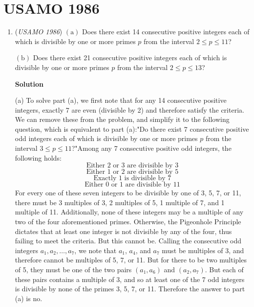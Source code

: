 \section{USAMO 1986}
        \begin{enumerate}
        	\item (\textit{USAMO 1986}) $(\text{a})$ Does there exist 14 consecutive positive integers each of which is divisible by one or more primes $p$ from the interval $2\le p \le 11$?


 $(\text{b})$ Does there exist 21 consecutive positive integers each of which is divisible by one or more primes $p$ from the interval $2\le p \le 13$?


 



\textbf{Solution}

(a)     To solve part (a), we first note that for any 14 consecutive positive integers, exactly 7 are even (divisible by 2) and therefore satisfy the criteria. We can remove these from the problem, and simplify it to the following question, which is equivalent to part (a):"Do there exist 7 consecutive positive odd integers each of which is divisible by one or more primes $p$ from the interval $3\le p \le 11$?"Among any 7 consecutive positive odd integers, the following holds:
 \[\text{Either 2 or 3 are divisible by 3}\]
 \[\text{Either 1 or 2 are divisible by 5}\]
 \[\text{Exactly 1 is divisible by 7}\]
 \[\text{Either 0 or 1 are divisible by 11}\]For every one of these seven integers to be divisible by one of 3, 5, 7, or 11, there must be 3 multiples of 3, 2 multiples of 5, 1 multiple of 7, and 1 multiple of 11. Additionally, none of these integers may be a multiple of any two of the four aforementioned primes. Otherwise, the Pigeonhole Principle dictates that at least one integer is not divisible by any of the four, thus failing to meet the criteria. But this cannot be. Calling the consecutive odd integers $a_1, a_2, \dots, a_7$, we note that $a_1$, $a_4$, and $a_7$ must be multiples of 3, and therefore cannot be multiples of 5, 7, or 11. But for there to be two multiples of 5, they must be one of the two pairs $(a_1,a_6)$ and $(a_2,a_7)$. But each of these pairs contains a multiple of 3, and so at least one of the 7 odd integers is divisible by none of the primes 3, 5, 7, or 11. Therefore the answer to part (a) is no.


\end{enumerate}
